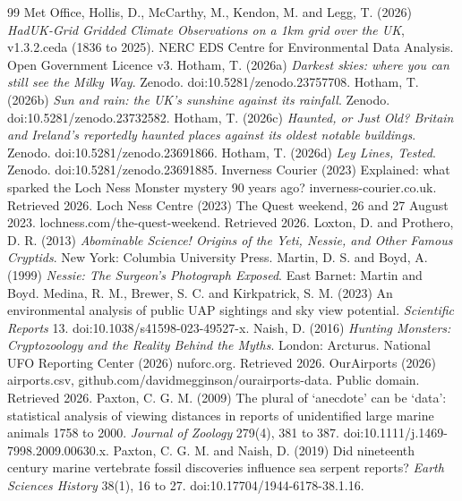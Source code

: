 \documentclass[11pt,a4paper]{article}
\begin{document}
\begin{thebibliography}{99}
 Met Office, Hollis, D., McCarthy, M., Kendon, M. and Legg, T. (2026) \textit{HadUK-Grid Gridded Climate Observations on a 1km grid over the UK}, v1.3.2.ceda (1836 to 2025). NERC EDS Centre for Environmental Data Analysis. Open Government Licence v3.
 Hotham, T. (2026a) \textit{Darkest skies: where you can still see the Milky Way}. Zenodo. doi:10.5281/zenodo.23757708.
 Hotham, T. (2026b) \textit{Sun and rain: the UK's sunshine against its rainfall}. Zenodo. doi:10.5281/zenodo.23732582.
 Hotham, T. (2026c) \textit{Haunted, or Just Old? Britain and Ireland's reportedly haunted places against its oldest notable buildings}. Zenodo. doi:10.5281/zenodo.23691866.
 Hotham, T. (2026d) \textit{Ley Lines, Tested}. Zenodo. doi:10.5281/zenodo.23691885.
 Inverness Courier (2023) Explained: what sparked the Loch Ness Monster mystery 90 years ago? inverness-courier.co.uk. Retrieved 2026.
 Loch Ness Centre (2023) The Quest weekend, 26 and 27 August 2023. lochness.com/the-quest-weekend. Retrieved 2026.
 Loxton, D. and Prothero, D. R. (2013) \textit{Abominable Science! Origins of the Yeti, Nessie, and Other Famous Cryptids}. New York: Columbia University Press.
 Martin, D. S. and Boyd, A. (1999) \textit{Nessie: The Surgeon's Photograph Exposed}. East Barnet: Martin and Boyd.
 Medina, R. M., Brewer, S. C. and Kirkpatrick, S. M. (2023) An environmental analysis of public UAP sightings and sky view potential. \textit{Scientific Reports} 13. doi:10.1038/s41598-023-49527-x.
 Naish, D. (2016) \textit{Hunting Monsters: Cryptozoology and the Reality Behind the Myths}. London: Arcturus.
 National UFO Reporting Center (2026) nuforc.org. Retrieved 2026.
 OurAirports (2026) airports.csv, github.com/davidmegginson/ourairports-data. Public domain. Retrieved 2026.
 Paxton, C. G. M. (2009) The plural of `anecdote' can be `data': statistical analysis of viewing distances in reports of unidentified large marine animals 1758 to 2000. \textit{Journal of Zoology} 279(4), 381 to 387. doi:10.1111/j.1469-7998.2009.00630.x.
 Paxton, C. G. M. and Naish, D. (2019) Did nineteenth century marine vertebrate fossil discoveries influence sea serpent reports? \textit{Earth Sciences History} 38(1), 16 to 27. doi:10.17704/1944-6178-38.1.16.

\end{thebibliography}
\end{document}
